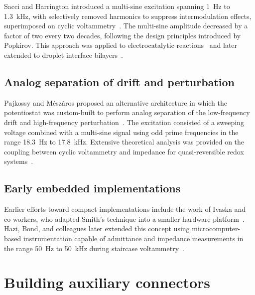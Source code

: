 Sacci and Harrington introduced a multi-sine excitation spanning 1~Hz to 1.3~kHz, with selectively removed harmonics to suppress intermodulation effects, superimposed on cyclic voltammetry~\cite{sacciDynamicImpedanceFormic2009}.
The multi-sine amplitude decreased by a factor of two every two decades, following the design principles introduced by Popkirov.
This approach was applied to electrocatalytic reactions~\cite{holmUnderstandingReactionMechanisms2018, holmDynamicElectrochemicalImpedance2019, holmUnderstandingReactionMechanisms2019, sacciDynamicElectrochemicalImpedance2014} and later extended to droplet interface bilayers~\cite{sacciDisentanglingMemristiveMemcapacitive2022}.

\section*{Analog separation of drift and perturbation}

Pajkossy and Mészáros proposed an alternative architecture in which the potentiostat was custom-built to perform analog separation of the low-frequency drift and high-frequency perturbation~\cite{pajkossyConnectionCVsImpedance2020}.
The excitation consisted of a sweeping voltage combined with a multi-sine signal using odd prime frequencies in the range 18.3~Hz to 17.8~kHz.
Extensive theoretical analysis was provided on the coupling between cyclic voltammetry and impedance for quasi-reversible redox systems~\cite{pajkossyDynamicElectrochemicalImpedance2019, pajkossyVoltammetryCoupledImpedance2020, pajkossyDynamicElectrochemicalImpedance2021}.

\section*{Early embedded implementations}

Earlier efforts toward compact implementations include the work of Ivaska and co-workers, who adapted Smith's technique into a smaller hardware platform~\cite{engblomExperiencesOnLineFourier1990}.
Hazi, Bond, and colleagues later extended this concept using microcomputer-based instrumentation capable of admittance and impedance measurements in the range 50~Hz to 50~kHz during staircase voltammetry~\cite{haziMicrocomputerbasedInstrumentationMultifrequency1997, schieweUnifiedApproachTrace1998}.

\chapter{Building auxiliary connectors}
\label{ap:aux cable}


